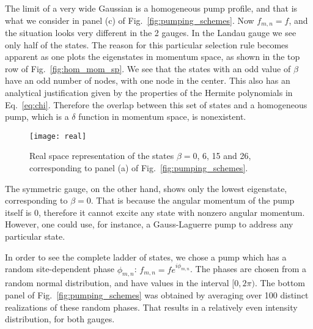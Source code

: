 \documentclass[twocolumn, 10pt, aps, superscriptaddress, floatfix, showpacs, pra, citeautoscript]{revtex4-1}
\newcommand{\co}[2]{#2}
\renewcommand{\paragraph}{\co}
\begin{document}
\paragraph{Homogeneous spectrum can be understood using a parity argument in momentum space.}
The limit of a very wide Gaussian is a homogeneous pump profile, and
that is what we consider in panel (c) of
Fig.~\ref{fig:pumping_schemes}. Now $f_{m,n} = f$, and the situation
looks very different in the 2 gauges.  In the Landau gauge we see only
half of the states. The reason for this particular selection rule
becomes apparent as one plots the eigenstates in momentum space, as
shown in the top row of Fig.~\ref{fig:hom_mom_sp}. We see that the
states with an odd value of $\beta$ have an odd number of nodes, with
one node in the center. This also has an analytical justification
given by the properties of the Hermite polynomials in
Eq.~\eqref{eq:chi}. Therefore the overlap between this set of states
and a homogeneous pump, which is a $\delta$ function in momentum
space, is nonexistent. 
%
\begin{figure}[htb]
  \centering
  \texttt{[image: real]} %
  \caption{Real space representation of the states $\beta=0$, 6, 15
    and 26, corresponding to panel (a) of
    Fig.~\ref{fig:pumping_schemes}.}
  \label{fig:delta_real_sp}
\end{figure}


The symmetric gauge, on the other hand, shows only the lowest
eigenstate, corresponding to $\beta=0$. That is because the angular
momentum of the pump itself is 0, therefore it cannot excite any state
with nonzero angular momentum. However, one could use, for instance, a
Gauss-Laguerre pump to address any particular state.

\paragraph{One must use a random phase in order to see all the states.}
In order to see the complete ladder of states, we chose a pump which
has a random site-dependent phase $\phi_{m,n}$:
$f_{m,n}=fe^{i\phi_{m,n}}$.  The phases are chosen from a random
normal distribution, and have values in the interval $[0,2\pi)$. The
bottom panel of Fig.~\ref{fig:pumping_schemes} was obtained by
averaging over 100 distinct realizations of these random phases. That
results in a relatively even intensity distribution, for both gauges.
\end{document}
